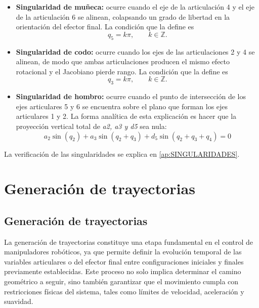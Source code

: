 \documentclass{article}
\begin{document}
\begin{itemize}
    \item \textbf{Singularidad de muñeca:} ocurre cuando el eje de la 
    articulación 4 y el eje de la articulación 6 se alinean, colapsando 
    un grado de libertad en la orientación del efector final. La condición 
    que la define es
    \begin{equation}
        q_5 = k\pi, \qquad k \in \mathbb{Z}.
    \end{equation}

    \item \textbf{Singularidad de codo:} ocurre cuando los ejes de las 
    articulaciones 2 y 4 se alinean, de modo que ambas articulaciones 
    producen el mismo efecto rotacional y el Jacobiano pierde rango. 
    La condición que la define es
    \begin{equation}
        q_3 = k\pi, \qquad k \in \mathbb{Z}.
    \end{equation}

    \item \textbf{Singularidad de hombro:} ocurre cuando el punto de intersección de los ejes articulares 5 y 6 se encuentra sobre el plano que forman los ejes articulares 1 y 2. La forma analítica de esta explicación es hacer que la proyección vertical total de \textit{a2, a3 y d5} sea nula:
    \begin{equation}
        a_2\sin(q_2)+a_3\sin(q_2+q_3)+d_5\sin(q_2+q_3+q_4)=0
    \end{equation}
    
\end{itemize}

La verificación de las singularidades se explica en \ref{ap:SINGULARIDADES}.

\newpage
\section{Generación de trayectorias}
\label{sec:planificacion_trayectorias}

%
%
\subsection{Generación de trayectorias}
\label{sec:generacion_trayectorias}

La generación de trayectorias constituye una etapa fundamental en el control de manipuladores robóticos, ya que permite definir la evolución temporal de las variables articulares o del efector final entre configuraciones iniciales y finales previamente establecidas. Este proceso no solo implica determinar el camino geométrico a seguir, sino también garantizar que el movimiento cumpla con restricciones físicas del sistema, tales como límites de velocidad, aceleración y suavidad.
\end{document}
